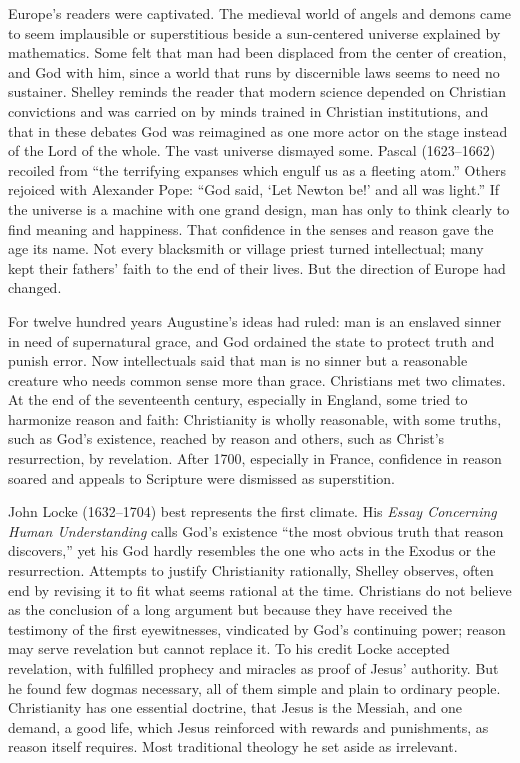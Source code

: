 Europe's readers were captivated. The medieval world of angels and demons came to seem implausible
or superstitious beside a sun-centered universe explained by mathematics. Some felt that man had
been displaced from the center of creation, and God with him, since a world that runs by discernible
laws seems to need no sustainer. Shelley reminds the reader that modern science depended on Christian
convictions and was carried on by minds trained in Christian institutions, and that in these debates
God was reimagined as one more actor on the stage instead of the Lord of the whole. The vast universe
dismayed some. Pascal (1623--1662) recoiled from ``the terrifying expanses which engulf us as a
fleeting atom.'' Others rejoiced with Alexander Pope: ``God said, `Let Newton be!' and all was
light.'' If the universe is a machine with one grand design, man has only to think clearly to find
meaning and happiness. That confidence in the senses and reason gave the age its name. Not every
blacksmith or village priest turned intellectual; many kept their fathers' faith to the end of their lives.
But the direction of Europe had changed.

For twelve hundred years Augustine's ideas had ruled: man is an enslaved sinner in need of
supernatural grace, and God ordained the state to protect truth and punish error. Now intellectuals
said that man is no sinner but a reasonable creature who needs common sense more than grace.
Christians met two climates. At the end of the seventeenth century, especially in England, some tried
to harmonize reason and faith: Christianity is wholly reasonable, with some truths, such as God's
existence, reached by reason and others, such as Christ's resurrection, by revelation. After 1700,
especially in France, confidence in reason soared and appeals to Scripture were dismissed as
superstition.

John Locke (1632--1704) best represents the first climate. His \emph{Essay Concerning Human
Understanding} calls God's existence ``the most obvious truth that reason discovers,'' yet his God
hardly resembles the one who acts in the Exodus or the resurrection. Attempts to justify Christianity
rationally, Shelley observes, often end by revising it to fit what seems rational at the time.
Christians do not believe as the conclusion of a long argument but because they have received the
testimony of the first eyewitnesses, vindicated by God's continuing power; reason may serve
revelation but cannot replace it. To his credit Locke accepted revelation, with fulfilled prophecy
and miracles as proof of Jesus' authority. But he found few dogmas necessary, all of them simple and
plain to ordinary people. Christianity has one essential doctrine, that Jesus is the Messiah, and one
demand, a good life, which Jesus reinforced with rewards and punishments, as reason itself requires.
Most traditional theology he set aside as irrelevant.

